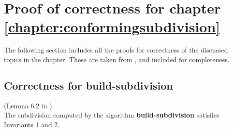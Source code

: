 \chapter{Proof of correctness for chapter \ref{chapter:conformingsubdivision}}

The following section includes all the proofs for correctness of the discussed topics in the chapter. These are taken from \cite{HershbergerS99}, and included for completeness.

\section{Correctness for \textbf{build-subdivision}}

\begin{Lemma} (Lemma 6.2 in \cite{HershbergerS99}) \\
The subdivision computed by the algorithm \textbf{build-subdivision} satisfies Invariants 1 and 2.
\end{Lemma}

